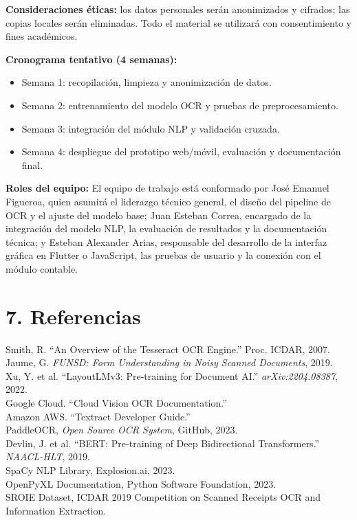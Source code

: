 \documentclass[12pt,a4paper]{article}
\begin{document}
\textbf{Consideraciones éticas:} los datos personales serán anonimizados y cifrados; las copias locales serán eliminadas. Todo el material se utilizará con consentimiento y fines académicos.

\textbf{Cronograma tentativo (4 semanas):}
\begin{itemize}
    \item Semana 1: recopilación, limpieza y anonimización de datos.
    \item Semana 2: entrenamiento del modelo OCR y pruebas de preprocesamiento.
    \item Semana 3: integración del módulo NLP y validación cruzada.
    \item Semana 4: despliegue del prototipo web/móvil, evaluación y documentación final.
\end{itemize}

\textbf{Roles del equipo:}
El equipo de trabajo está conformado por José Emanuel Figueroa, quien asumirá el liderazgo técnico general, el diseño del pipeline de OCR y el ajuste del modelo base; Juan Esteban Correa, encargado de la integración del modelo NLP, la evaluación de resultados y la documentación técnica; y Esteban Alexander Arias, responsable del desarrollo de la interfaz gráfica en Flutter o JavaScript, las pruebas de usuario y la conexión con el módulo contable.


\section*{7. Referencias}

Smith, R. “An Overview of the Tesseract OCR Engine.” Proc. ICDAR, 2007.\\
Jaume, G. \textit{FUNSD: Form Understanding in Noisy Scanned Documents}, 2019.\\
Xu, Y. et al. “LayoutLMv3: Pre-training for Document AI.” \textit{arXiv:2204.08387}, 2022.\\
Google Cloud. “Cloud Vision OCR Documentation.”\\
Amazon AWS. “Textract Developer Guide.”\\
PaddleOCR, \textit{Open Source OCR System}, GitHub, 2023.\\
Devlin, J. et al. “BERT: Pre-training of Deep Bidirectional Transformers.” \textit{NAACL-HLT}, 2019.\\
SpaCy NLP Library, Explosion.ai, 2023.\\
OpenPyXL Documentation, Python Software Foundation, 2023.\\
SROIE Dataset, ICDAR 2019 Competition on Scanned Receipts OCR and Information Extraction.
\end{document}
